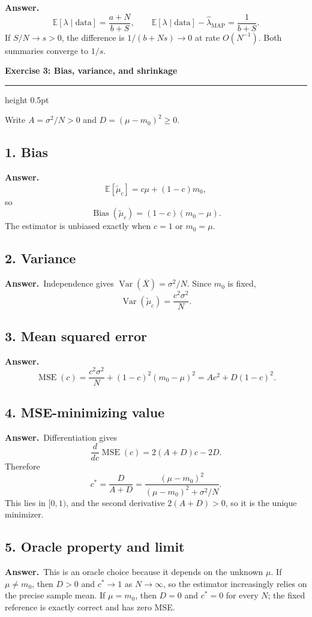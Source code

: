 \documentclass[11pt,a4paper]{article}
\newcommand{\exercise}[2]{%
  \Needspace{8\baselineskip}%
  \par\addvspace{1.1em}%
  {\Large\bfseries\color{examblue}Exercise #1: #2\par}%
  \nobreak\vspace{0.2em}%
  {\color{rulegray}\hrule height 0.5pt}%
  \vspace{0.55em}%
}
\newcommand{\answer}{\textbf{Answer.}\ }
\begin{document}
\answer
\[
  \mathbb{E}[\lambda\mid\text{data}]
  =\frac{a+N}{b+S},
  \qquad
  \mathbb{E}[\lambda\mid\text{data}]
  -\widehat\lambda_{\mathrm{MAP}}
  =\boxed{\frac{1}{b+S}}.
\]
If $S/N\to s>0$, the difference is $1/(b+Ns)\to0$ at rate $O(N^{-1})$. Both summaries converge to $1/s$.

\exercise{3}{Bias, variance, and shrinkage}

Write $A=\sigma^2/N>0$ and $D=(\mu-m_0)^2\geq0$.

\subsection*{1. Bias}

\answer
\[
  \mathbb{E}[\widetilde\mu_c]
  =c\mu+(1-c)m_0,
\]
so
\[
  \boxed{\operatorname{Bias}(\widetilde\mu_c)
  =(1-c)(m_0-\mu)}.
\]
The estimator is unbiased exactly when $c=1$ or $m_0=\mu$.

\subsection*{2. Variance}

\answer Independence gives $\operatorname{Var}(\overline X)=\sigma^2/N$. Since $m_0$ is fixed,
\[
  \boxed{\operatorname{Var}(\widetilde\mu_c)
  =\frac{c^2\sigma^2}{N}}.
\]

\subsection*{3. Mean squared error}

\answer
\[
  \boxed{\operatorname{MSE}(c)
  =\frac{c^2\sigma^2}{N}
  +(1-c)^2(m_0-\mu)^2
  =Ac^2+D(1-c)^2}.
\]

\subsection*{4. MSE-minimizing value}

\answer Differentiation gives
\[
  \frac{d}{dc}\operatorname{MSE}(c)
  =2(A+D)c-2D.
\]
Therefore
\[
  \boxed{c^*=\frac{D}{A+D}
  =\frac{(\mu-m_0)^2}
  {(\mu-m_0)^2+\sigma^2/N}}.
\]
This lies in $[0,1)$, and the second derivative $2(A+D)>0$, so it is the unique minimizer.

\subsection*{5. Oracle property and limit}

\answer This is an oracle choice because it depends on the unknown $\mu$. If $\mu\neq m_0$, then $D>0$ and $c^*\to1$ as $N\to\infty$, so the estimator increasingly relies on the precise sample mean. If $\mu=m_0$, then $D=0$ and $c^*=0$ for every $N$; the fixed reference is exactly correct and has zero MSE.
\end{document}
